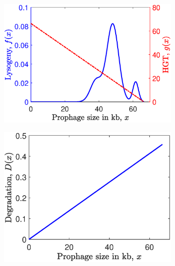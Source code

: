 \begin{figure}[htb!]
\captionsetup[subfigure]{labelformat=empty}
\begin{subfigure}[t]{0.5\textwidth}
\centering
\includegraphics[scale=0.5]{phage1.eps}
\subcaption[subfigcapskip = 50pt]{}

\end{subfigure}\hfill
\begin{subfigure}[t]{0.5\textwidth}
\includegraphics[scale=0.5]{deg2.eps}
            \subcaption[subfigcapskip = 50pt]{}
            

\end{subfigure}
\end{figure}
